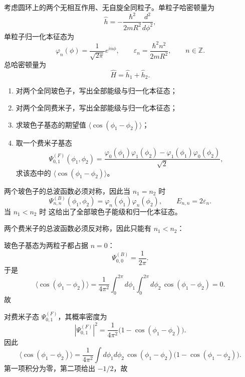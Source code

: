 \begin{question}
考虑圆环上的两个无相互作用、无自旋全同粒子。单粒子哈密顿量为
\[
\hat h=-\frac{\hbar^2}{2mR^2}\frac{d^2}{d\phi^2},
\]
单粒子归一化本征态为
\[
\varphi_n(\phi)=\frac{1}{\sqrt{2\pi}}e^{in\phi},
\qquad
\varepsilon_n=\frac{\hbar^2 n^2}{2mR^2},
\qquad n\in\mathbb Z.
\]
总哈密顿量为
\[
\hat H=\hat h_1+\hat h_2.
\]

\begin{enumerate}[label=(\arabic*),leftmargin=2.5em]
  \item 对两个全同玻色子，写出全部能级与归一化本征态；
  \item 对两个全同费米子，写出全部能级与归一化本征态；
  \item 求玻色子基态的期望值 $\langle \cos(\phi_1-\phi_2)\rangle$；
  \item 取一个费米子基态
  \[
  \Psi_{0,1}^{(F)}(\phi_1,\phi_2)=\frac{\varphi_0(\phi_1)\varphi_1(\phi_2)-\varphi_1(\phi_1)\varphi_0(\phi_2)}{\sqrt2},
  \]
  求该态中的 $\langle \cos(\phi_1-\phi_2)\rangle$。
\end{enumerate}

\begin{solution}
两个玻色子的总波函数必须对称，因此当 $n_1=n_2$ 时
\[
\Psi_{n,n}^{(B)}(\phi_1,\phi_2)=\varphi_n(\phi_1)\varphi_n(\phi_2),
\qquad
E_{n,n}=2\varepsilon_n.
\]
当 $n_1<n_2$ 时
这给出了全部玻色子能级和归一化本征态。

两个费米子的总波函数必须反对称，因此只能有 $n_1<n_2$：

玻色子基态为两粒子都占据 $n=0$：
\[
\Psi_{0,0}^{(B)}=\frac{1}{2\pi}.
\]
于是
\[
\langle \cos(\phi_1-\phi_2)\rangle
=\frac{1}{4\pi^2}\int_0^{2\pi}d\phi_1\int_0^{2\pi}d\phi_2\,\cos(\phi_1-\phi_2)=0.
\]
故

对费米子态 $\Psi_{0,1}^{(F)}$，其概率密度为
\[
|\Psi_{0,1}^{(F)}|^2=\frac{1}{4\pi^2}\bigl(1-\cos(\phi_1-\phi_2)\bigr).
\]
因此
\[
\langle \cos(\phi_1-\phi_2)\rangle
=\frac{1}{4\pi^2}\int d\phi_1d\phi_2\,\cos(\phi_1-\phi_2)\bigl(1-\cos(\phi_1-\phi_2)\bigr).
\]
第一项积分为零，第二项给出 $-1/2$，故
\end{solution}
\end{question}

